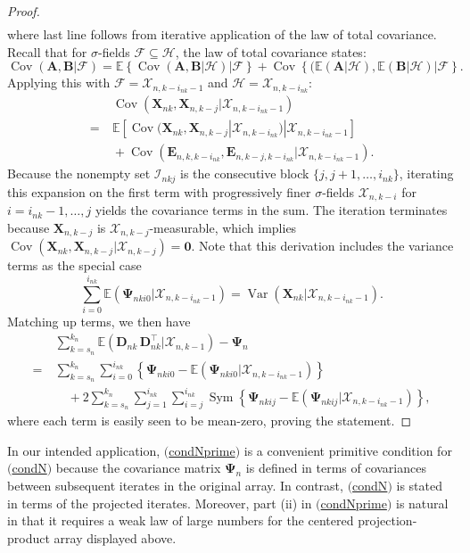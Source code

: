 \documentclass[11pt]{article}
\renewcommand\vec[1]{\boldsymbol{#1}}
\newcommand\mat[1]{\mathbf{#1}}
\DeclareMathOperator{\Cov}{Cov}
\DeclareMathOperator{\Var}{Var}
\DeclareMathOperator{\Sym}{Sym}
\newcommand{\E}{\mathbb{E}}
\newcommand{\Hcal}{\mathcal{H}}
\newcommand{\X}{\mathcal{X}}
\newcommand{\F}{\mathcal{F}}
\newcommand{\I}{\mathcal{I}}
\newcommand{\refitem}[1]{$\mathrm{(}$\hyperlink{cond:#1}{\csname cond#1\endcsname}$\mathrm{)}$}
\theoremstyle{definition}
\begin{document}
\begin{proof}
\begin{align*}
\end{align*}
where last line follows from iterative application of the law of total covariance. Recall that for $\sigma$-fields $\F \subseteq \Hcal$, the law of total covariance states:
\[\Cov(\vec{A}, \vec{B} | \F) = \E\left\{\Cov\left(\vec{A}, \vec{B} \big| \Hcal\right) \Big| \F\right\} + \Cov\left\{(\E(\vec{A} \big| \Hcal), \E(\vec{B} | \Hcal) \Big| \F\right\}.\]
Applying this with $\F = \X_{n,k-i_{nk}-1}$ and $\Hcal = \X_{n,k-i_{nk}}$:
\begin{align*}
&\ \Cov(\vec{X}_{nk}, \vec{X}_{n,k-j} | \X_{n,k-i_{nk}-1}) \\
=&\ \E[\Cov(\vec{X}_{nk}, \vec{X}_{n,k-j} | \X_{n,k-i_{nk}}) | \X_{n,k-i_{nk}-1}] \\
&\ + \Cov(\vec{E}_{n,k,k-i_{nk}}, \vec{E}_{n,k-j,k-i_{nk}} | \X_{n,k-i_{nk}-1}).
\end{align*}
Because the nonempty set \(\I_{nkj}\) is the consecutive block \(\{j,j+1,\ldots,i_{nk}\}\), iterating this expansion on the first term with progressively finer $\sigma$-fields $\X_{n,k-i}$ for $i = i_{nk}-1, \ldots, j$ yields the covariance terms in the sum. The iteration terminates because $\vec{X}_{n,k-j}$ is $\X_{n,k-j}$-measurable, which implies $\Cov(\vec{X}_{nk}, \vec{X}_{n,k-j} | \X_{n,k-j}) = \mat{0}$.
Note that this derivation includes the variance terms as the special case
\[
\sum_{i=0}^{i_{nk}} \E\left(\mat{\Psi}_{nki0} \Big| \X_{n,k-i_{nk}-1}\right) = \Var(\vec{X}_{nk} | \X_{n,k-i_{nk}-1}).
\]
Matching up terms, we then have
\begin{align*}
    &\ \sum_{k=s_n}^{k_n} \E\left(\vec{D}_{nk}\, \vec{D}_{nk}^{\top} | \X_{n,k-1}\right) - \mat{\Psi}_n \\
    =&\ \sum_{k=s_n}^{k_n} \sum_{i=0}^{i_{nk}} \left\{\mat{\Psi}_{nki0} - \E\left(\mat{\Psi}_{nki0} | \X_{n,k-i_{nk}-1}\right) \right\} \\
    &\ \quad + 2 \sum_{k=s_n}^{k_n}
    \sum_{j=1}^{i_{nk}}
    \sum_{i=j}^{i_{nk}}
    \Sym\left\{\mat{\Psi}_{nkij} - \E\left(\mat{\Psi}_{nkij} | \X_{n,k-i_{nk}-1}\right)\right\},
\end{align*}
where each term is easily seen to be mean-zero, proving the statement.
\end{proof}

In our intended application, \refitem{Nprime} is a convenient primitive condition for \refitem{N} because the covariance matrix $\mat{\Psi}_n$ is defined in terms of covariances between subsequent iterates in the original array.
In contrast, \refitem{N} is stated in terms of the projected iterates.
Moreover, part (ii) in \refitem{Nprime} is natural in that it requires a weak law of large numbers for the centered projection-product array displayed above.
\end{document}
